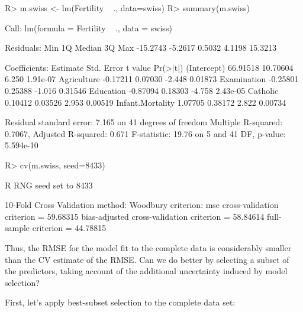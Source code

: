 \documentclass[
]{jss}
\begin{document}
\begin{CodeChunk}
\begin{CodeInput}
R> m.swiss <- lm(Fertility ~ ., data=swiss)
R> summary(m.swiss)
\end{CodeInput}
\begin{CodeOutput}

Call:
lm(formula = Fertility ~ ., data = swiss)

Residuals:
     Min       1Q   Median       3Q      Max 
-15.2743  -5.2617   0.5032   4.1198  15.3213 

Coefficients:
                 Estimate Std. Error t value Pr(>|t|)
(Intercept)      66.91518   10.70604   6.250 1.91e-07
Agriculture      -0.17211    0.07030  -2.448  0.01873
Examination      -0.25801    0.25388  -1.016  0.31546
Education        -0.87094    0.18303  -4.758 2.43e-05
Catholic          0.10412    0.03526   2.953  0.00519
Infant.Mortality  1.07705    0.38172   2.822  0.00734

Residual standard error: 7.165 on 41 degrees of freedom
Multiple R-squared:  0.7067,    Adjusted R-squared:  0.671 
F-statistic: 19.76 on 5 and 41 DF,  p-value: 5.594e-10
\end{CodeOutput}
\begin{CodeInput}
R> cv(m.swiss, seed=8433)
\end{CodeInput}
\begin{CodeOutput}
R RNG seed set to 8433
\end{CodeOutput}
\begin{CodeOutput}
10-Fold Cross Validation
method: Woodbury
criterion: mse
cross-validation criterion = 59.68315
bias-adjusted cross-validation criterion = 58.84614
full-sample criterion = 44.78815 
\end{CodeOutput}
\end{CodeChunk}

Thus, the RMSE for the model fit to the complete data is considerably
smaller than the CV estimate of the RMSE. Can we do better by selecting
a subset of the predictors, taking account of the additional uncertainty
induced by model selection?

First, let's apply best-subset selection to the complete data set:
\end{document}
